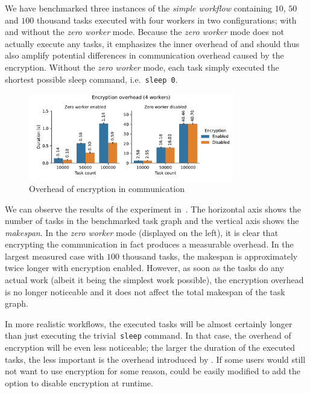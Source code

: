 We have benchmarked three instances of the \emph{simple workflow} containing
$10$, $50$ and $100$ thousand tasks executed
with four \hyperqueue{} workers in two configurations; with and without the
\emph{zero worker} mode. Because the \emph{zero worker} mode does not actually execute
any tasks, it emphasizes the inner overhead of \hyperqueue{} and should thus also amplify
potential differences in communication overhead caused by the encryption. Without the
\emph{zero worker} mode, each task simply executed the shortest possible sleep command, i.e.\
\texttt{sleep 0}.

\begin{figure}[h]
	\centering
	\includegraphics[width=0.8\textwidth]{imgs/hq/charts/encryption-overhead}
	\caption{Overhead of encryption in \hyperqueue{} communication}
	\label{fig:hq-encryption-overhead}
\end{figure}

We can observe the results of the experiment in~. The horizontal axis shows
the number of tasks in the benchmarked task graph and the vertical axis shows the
\emph{makespan}. In the \emph{zero worker} mode (displayed on the left), it is clear
that encrypting the communication in fact produces a measurable overhead. In the largest measured
case with $100$ thousand tasks, the makespan is approximately twice longer with
encryption enabled. However, as soon as the tasks do any actual work (albeit it being the simplest
work possible), the encryption overhead is no longer noticeable and it does not affect the total
makespan of the task graph.

In more realistic workflows, the executed tasks will be almost certainly longer than just executing
the trivial~\texttt{sleep} command. In that case, the overhead of encryption will be even
less noticeable; the larger the duration of the executed tasks, the less important is the overhead
introduced by \hyperqueue{}. If some users would still not want to use encryption for
some reason, \hyperqueue{} could be easily modified to add the option to disable
encryption at runtime.

